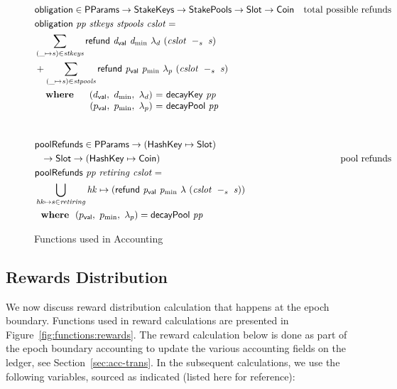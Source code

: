 \begin{figure}[htb]
  \begin{align*}
      & \fun{obligation} \in \PParams \to \StakeKeys \to \StakePools \to \Slot \to \Coin
      & \text{total possible refunds} \\
      & \obligation{pp}{stkeys}{stpools}{cslot} =\\
      & \sum\limits_{(\_ \mapsto s) \in \var{stkeys}}
        \refund{d_{\mathsf{val}}}{d_{\min}}{\lambda_d}{(\slotminus{cslot}{s})} \\
      & + \sum\limits_{(\_ \mapsto s) \in \var{stpools}}
        \refund{p_{\mathsf{val}}}{p_{\min}}{\lambda_p}{(\slotminus{cslot}{s})} \\
      &
      \begin{array}{lr@{~=~}l}
        \where
          & (\dval,~d_{\min},~\lambda_d) & \fun{decayKey}~\var{pp}\\
          & (p_{\mathsf{val}},~p_{\min},~\lambda_p) & \fun{decayPool}~\var{pp}\\
      \end{array}\\
      \nextdef
      & \fun{poolRefunds} \in \PParams \to (\HashKey \mapsto \Slot) \\
      & ~~ \to \Slot \to (\HashKey \mapsto \Coin)
      & \text{pool refunds} \\
      & \poolRefunds{pp}{retiring}{cslot} = \\
      & \bigcup_{\var{hk}\mapsto s\in\var{retiring}}
          \var{hk}\mapsto( \refund{p_{\mathsf{val}}}{p_{\min}}{\lambda}{(\slotminus{cslot}{s})} ) \\
      &
        \where (p_{\mathsf{val}},~p_{\min},~\lambda_p) = \fun{decayPool}~\var{pp}\\
  \end{align*}
  \caption{Functions used in Accounting}
  \label{fig:functions:epoch}
\end{figure}

\subsection{Rewards Distribution}
\label{sec:reward-dist}

We now discuss reward distribution calculation that happens at the epoch boundary.
Functions used in reward calculations are presented in
Figure~\ref{fig:functions:rewards}. The reward calculation below is done as part of the
epoch boundary accounting to update the various accounting fields on the ledger,
see Section~\ref{sec:acc-trans}. In the subsequent calculations, we use the
following variables, sourced as indicated (listed here for reference):

